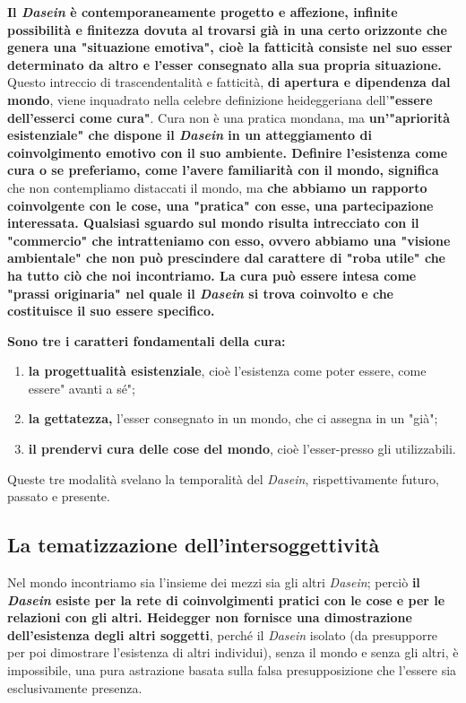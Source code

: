 \textbf{Il \textit{Dasein} è contemporaneamente progetto e affezione,
infinite possibilità  e finitezza dovuta al
trovarsi già in una certo orizzonte che genera una
"situazione emotiva", cioè la fatticità consiste
nel suo esser determinato da altro e l'esser
consegnato alla sua propria situazione.}
Questo intreccio di trascendentalità e fatticità,
\textbf{di apertura e dipendenza dal mondo}, viene inquadrato
nella celebre definizione heideggeriana dell'\textbf{"essere
dell'esserci come cura"}. Cura non è una
pratica mondana, ma \textbf{un'"apriorità esistenziale"
che dispone il \textit{Dasein} in un atteggiamento di
coinvolgimento emotivo con il suo ambiente.
Definire l'esistenza come cura o se preferiamo, come l'avere familiarità con il mondo, significa} che
non contempliamo distaccati il mondo, ma \textbf{che
abbiamo un rapporto coinvolgente con le cose, una
"pratica" con esse, una partecipazione interessata.
Qualsiasi sguardo sul mondo risulta intrecciato con
il "commercio" che intratteniamo con esso, ovvero abbiamo
una "visione ambientale" che non può prescindere
dal carattere di "roba utile" che ha tutto ciò
che noi incontriamo. La cura può essere intesa
come "prassi originaria" nel quale il \textit{Dasein} si
trova coinvolto e che costituisce il suo essere
specifico.}

\textbf{Sono tre i caratteri fondamentali della cura:}
\begin{enumerate}
	\item \textbf{la progettualità esistenziale}, cioè l'esistenza
	come poter essere, come essere" avanti a sé";
	\item \textbf{la gettatezza,} l'esser consegnato in un mondo,
	che ci assegna in un "già";
	\item \textbf{il prendervi cura delle cose del mondo}, cioè
	l'esser-presso gli utilizzabili.
\end{enumerate}

Queste tre modalità svelano la temporalità del
\textit{Dasein}, rispettivamente futuro, passato e presente.

\subsection{La tematizzazione dell'intersoggettività}

Nel mondo incontriamo sia l'insieme dei mezzi
sia gli altri \textit{Dasein}; perciò \textbf{il \textit{Dasein} esiste per
la rete di coinvolgimenti pratici con le cose e
per le relazioni con gli altri. Heidegger non fornisce una dimostrazione dell'esistenza degli altri soggetti}, perché il \textit{Dasein} isolato (da presupporre per poi dimostrare l'esistenza di altri individui), senza il mondo e senza gli altri, è impossibile, una pura astrazione basata sulla falsa presupposizione che l'essere sia esclusivamente presenza.

